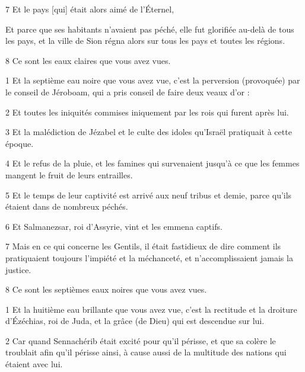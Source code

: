 \par 7 Et le pays [qui] était alors aimé de l'Éternel,

\par Et parce que ses habitants n'avaient pas péché, elle fut glorifiée au-delà de tous les pays, et la ville de Sion régna alors sur tous les pays et toutes les régions.

\par 8 Ce sont les eaux claires que vous avez vues.


\par 1 Et la septième eau noire que vous avez vue, c'est la perversion (provoquée) par le conseil de Jéroboam, qui a pris conseil de faire deux veaux d'or :

\par 2 Et toutes les iniquités commises iniquement par les rois qui furent après lui.

\par 3 Et la malédiction de Jézabel et le culte des idoles qu'Israël pratiquait à cette époque.

\par 4 Et le refus de la pluie, et les famines qui survenaient jusqu'à ce que les femmes mangent le fruit de leurs entrailles.

\par 5 Et le temps de leur captivité est arrivé aux neuf tribus et demie, parce qu'ils étaient dans de nombreux péchés.

\par 6 Et Salmanezsar, roi d'Assyrie, vint et les emmena captifs.

\par 7 Mais en ce qui concerne les Gentils, il était fastidieux de dire comment ils pratiquaient toujours l'impiété et la méchanceté, et n'accomplissaient jamais la justice.

\par 8 Ce sont les septièmes eaux noires que vous avez vues.


\par 1 Et la huitième eau brillante que vous avez vue, c'est la rectitude et la droiture d'Ézéchias, roi de Juda, et la grâce (de Dieu) qui est descendue sur lui.

\par 2 Car quand Sennachérib était excité pour qu'il périsse, et que sa colère le troublait afin qu'il périsse ainsi, à cause aussi de la multitude des nations qui étaient avec lui.


